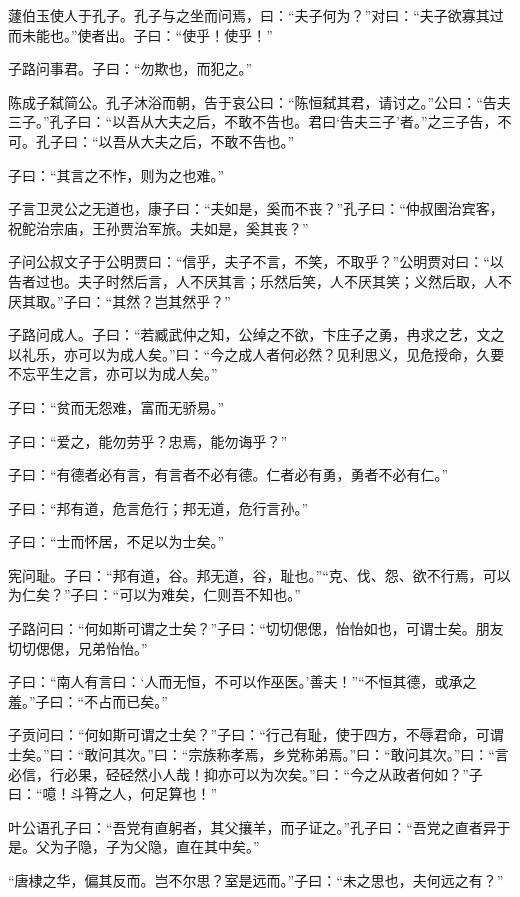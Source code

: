 \documentclass[a5paper]{ctexbook}
\begin{document}
    蘧伯玉使人于孔子。孔子与之坐而问焉，曰：“夫子何为？”对曰：“夫子欲寡其过而未能也。”使者出。子曰：“使乎！使乎！”

    子路问事君。子曰：“勿欺也，而犯之。”

    陈成子弑简公。孔子沐浴而朝，告于哀公曰：“陈恒弑其君，请讨之。”公曰：“告夫三子。”孔子曰：“以吾从大夫之后，不敢不告也。君曰‘告夫三子’者。”之三子告，不可。孔子曰：“以吾从大夫之后，不敢不告也。”

    子曰：“其言之不怍，则为之也难。”

    子言卫灵公之无道也，康子曰：“夫如是，奚而不丧？”孔子曰：“仲叔圉治宾客，祝𬶍治宗庙，王孙贾治军旅。夫如是，奚其丧？”

    子问公叔文子于公明贾曰：“信乎，夫子不言，不笑，不取乎？”公明贾对曰：“以告者过也。夫子时然后言，人不厌其言；乐然后笑，人不厌其笑；义然后取，人不厌其取。”子曰：“其然？岂其然乎？”

    子路问成人。子曰：“若臧武仲之知，公绰之不欲，卞庄子之勇，冉求之艺，文之以礼乐，亦可以为成人矣。”曰：“今之成人者何必然？见利思义，见危授命，久要不忘平生之言，亦可以为成人矣。”

    子曰：“贫而无怨难，富而无骄易。”

    子曰：“爱之，能勿劳乎？忠焉，能勿诲乎？”

    子曰：“有德者必有言，有言者不必有德。仁者必有勇，勇者不必有仁。”

    子曰：“邦有道，危言危行；邦无道，危行言孙。”

    子曰：“士而怀居，不足以为士矣。”

    宪问耻。子曰：“邦有道，谷。邦无道，谷，耻也。”“克、伐、怨、欲不行焉，可以为仁矣？”子曰：“可以为难矣，仁则吾不知也。”

    子路问曰：“何如斯可谓之士矣？”子曰：“切切偲偲，怡怡如也，可谓士矣。朋友切切偲偲，兄弟怡怡。”

    子曰：“南人有言曰：‘人而无恒，不可以作巫医。’善夫！”“不恒其德，或承之羞。”子曰：“不占而已矣。”

    子贡问曰：“何如斯可谓之士矣？”子曰：“行己有耻，使于四方，不辱君命，可谓士矣。”曰：“敢问其次。”曰：“宗族称孝焉，乡党称弟焉。”曰：“敢问其次。”曰：“言必信，行必果，硁硁然小人哉！抑亦可以为次矣。”曰：“今之从政者何如？”子曰：“噫！斗筲之人，何足算也！”

    叶公语孔子曰：“吾党有直躬者，其父攘羊，而子证之。”孔子曰：“吾党之直者异于是。父为子隐，子为父隐，直在其中矣。”

    “唐棣之华，偏其反而。岂不尔思？室是远而。”子曰：“未之思也，夫何远之有？”
\end{document}
